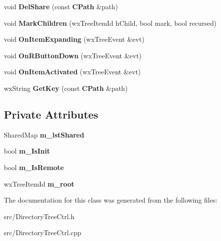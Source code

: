 \begin{DoxyCompactItemize}
\item 
void {\bfseries DelShare} (const {\bf CPath} \&path)\label{classCDirectoryTreeCtrl_a0a691c515fed2686a9a19a4411bf1e40}

\item 
void {\bfseries MarkChildren} (wxTreeItemId hChild, bool mark, bool recursed)\label{classCDirectoryTreeCtrl_a33b3a0054213aef194d58fe81913837d}

\item 
void {\bfseries OnItemExpanding} (wxTreeEvent \&evt)\label{classCDirectoryTreeCtrl_a5728ce83028836ffdb32e6aff4ec0110}

\item 
void {\bfseries OnRButtonDown} (wxTreeEvent \&evt)\label{classCDirectoryTreeCtrl_a6b240fe087c27923f1c61e1961d3cd61}

\item 
void {\bfseries OnItemActivated} (wxTreeEvent \&evt)\label{classCDirectoryTreeCtrl_a394b549f16cfcec90f91d393e756c6c0}

\item 
wxString {\bfseries GetKey} (const {\bf CPath} \&path)\label{classCDirectoryTreeCtrl_a7ba577b94239e581b05297ed81933e0f}

\end{DoxyCompactItemize}
\subsection*{Private Attributes}
\begin{DoxyCompactItemize}
\item 
SharedMap {\bfseries m\_\-lstShared}\label{classCDirectoryTreeCtrl_a946110448bad5c9c6232d1fb8307c1e4}

\item 
bool {\bfseries m\_\-IsInit}\label{classCDirectoryTreeCtrl_ae11c6dcf2af5a87cd48c05a93ed2f38f}

\item 
bool {\bfseries m\_\-IsRemote}\label{classCDirectoryTreeCtrl_ac1f8dcd1893c25dc7fc9ebf236c1a62a}

\item 
wxTreeItemId {\bfseries m\_\-root}\label{classCDirectoryTreeCtrl_a3071dbd94a48fecca6026fde603d5034}

\end{DoxyCompactItemize}


The documentation for this class was generated from the following files:\begin{DoxyCompactItemize}
\item 
src/DirectoryTreeCtrl.h\item 
src/DirectoryTreeCtrl.cpp\end{DoxyCompactItemize}
